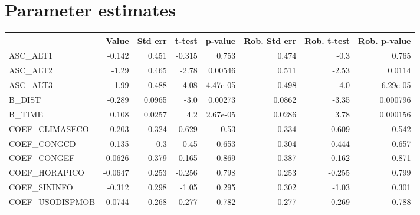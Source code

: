 \section{Parameter estimates}
\begin{tabular}{lrrrrrrr}
\toprule
{} &   Value &  Std err &  t-test &  p-value &  Rob. Std err &  Rob. t-test &  Rob. p-value \\
\midrule
ASC\_ALT1        &  -0.142 &    0.451 &  -0.315 &    0.753 &         0.474 &         -0.3 &         0.765 \\
ASC\_ALT2        &   -1.29 &    0.465 &   -2.78 &  0.00546 &         0.511 &        -2.53 &        0.0114 \\
ASC\_ALT3        &   -1.99 &    0.488 &   -4.08 & 4.47e-05 &         0.498 &         -4.0 &      6.29e-05 \\
B\_DIST          &  -0.289 &   0.0965 &    -3.0 &  0.00273 &        0.0862 &        -3.35 &      0.000796 \\
B\_TIME          &   0.108 &   0.0257 &     4.2 & 2.67e-05 &        0.0286 &         3.78 &      0.000156 \\
COEF\_CLIMASECO  &   0.203 &    0.324 &   0.629 &     0.53 &         0.334 &        0.609 &         0.542 \\
COEF\_CONGCD     &  -0.135 &      0.3 &   -0.45 &    0.653 &         0.304 &       -0.444 &         0.657 \\
COEF\_CONGEF     &  0.0626 &    0.379 &   0.165 &    0.869 &         0.387 &        0.162 &         0.871 \\
COEF\_HORAPICO   & -0.0647 &    0.253 &  -0.256 &    0.798 &         0.253 &       -0.255 &         0.799 \\
COEF\_SININFO    &  -0.312 &    0.298 &   -1.05 &    0.295 &         0.302 &        -1.03 &         0.301 \\
COEF\_USODISPMOB & -0.0744 &    0.268 &  -0.277 &    0.782 &         0.277 &       -0.269 &         0.788 \\
\bottomrule
\end{tabular}

